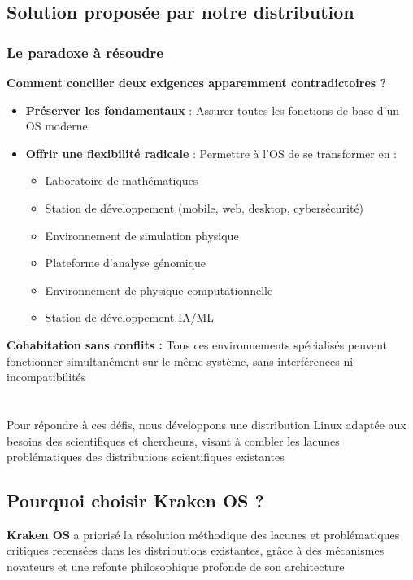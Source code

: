 \begin{itemize}[leftmargin=*,nosep]
\subsection{Solution proposée par notre distribution}

\subsubsection{Le paradoxe à résoudre}
\textbf{Comment concilier deux exigences apparemment contradictoires ?}
\begin{itemize}
\item \textbf{Préserver les fondamentaux }: Assurer toutes les fonctions de base d'un OS moderne
\item \textbf{Offrir une flexibilité radicale }: Permettre à l'OS de se transformer en :
\begin{itemize}
\item Laboratoire de mathématiques
\item Station de développement (mobile, web, desktop, cybersécurité)
\item Environnement de simulation physique
\item Plateforme d'analyse génomique
\item Environnement de physique computationnelle
\item Station de développement IA/ML
\end{itemize}
\end{itemize}
\textbf{Cohabitation sans conflits :} Tous ces environnements spécialisés peuvent fonctionner simultanément sur le même système, sans interférences ni incompatibilités \\ 
\\
\\

 Pour répondre à ces défis, nous développons une distribution Linux adaptée aux besoins des scientifiques et chercheurs, visant à combler les lacunes problématiques des distributions scientifiques existantes


\subsection{Pourquoi choisir Kraken OS ?}

\textbf{Kraken OS} a priorisé la résolution méthodique des lacunes et problématiques critiques recensées dans les distributions existantes, grâce à des mécanismes novateurs et une refonte philosophique profonde de son architecture


\end{itemize}

